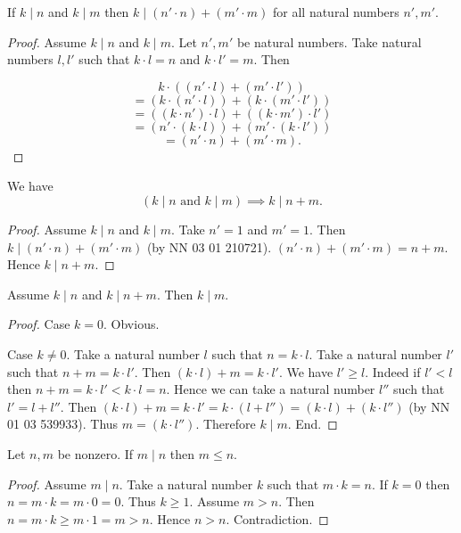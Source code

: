 \documentclass[../../natural-numbers.ftl.tex]{subfiles}
\begin{document}
\begin{forthel}
    \begin{proposition}[NN 03 01 210721]
      If $k \mid n$ and $k \mid m$ then $k \mid (n' \cdot n) + (m' \cdot m)$ for all natural numbers $n',m'$.
    \end{proposition}
    \begin{proof}
      Assume $k \mid n$ and $k \mid m$.
      Let $n',m'$ be natural numbers.
      Take natural numbers $l,l'$ such that $k \cdot l = n$ and $k \cdot l' = m$.
      Then

      \[   k \cdot ((n' \cdot l) + (m' \cdot l')) \]
      \[ = (k \cdot (n' \cdot l)) + (k \cdot (m' \cdot l')) \]
      \[ = ((k \cdot n') \cdot l) + ((k \cdot m') \cdot l') \]
      \[ = (n' \cdot (k \cdot l)) + (m' \cdot (k \cdot l')) \]
      \[ = (n' \cdot n) + (m' \cdot m). \]
    \end{proof}

    \begin{corollary}
      We have \[ (\text{$k \mid n$ and $k \mid m$}) \implies k \mid n + m. \]
    \end{corollary}
    \begin{proof}
      Assume $k \mid n$ and $k \mid m$.
      Take $n' = 1$ and $m' = 1$.
      Then $k \mid (n' \cdot n) + (m' \cdot m)$ (by NN 03 01 210721).
      $(n' \cdot n) + (m' \cdot m) = n + m$.
      Hence $k \mid n + m$.
    \end{proof}

    \begin{proposition}[NN 03 01 695362]
      Assume $k \mid n$ and $k \mid n + m$.
      Then $k \mid m$.
    \end{proposition}
    \begin{proof}
      Case $k = 0$. Obvious.

      Case $k \neq 0$.
        Take a natural number $l$ such that $n = k \cdot l$.
        Take a natural number $l'$ such that $n + m = k \cdot l'$.
        Then $(k \cdot l) + m = k \cdot l'$.
        We have $l' \geq l$.
        Indeed if $l' < l$ then $n + m = k \cdot l' < k \cdot l = n$.
        Hence we can take a natural number $l''$ such that $l' = l + l''$.
        Then $(k \cdot l) + m = k \cdot l' = k \cdot (l + l'') = (k \cdot l) + (k \cdot l'')$ (by NN 01 03 539933).
        Thus $m = (k \cdot l'')$.
        Therefore $k \mid m$.
      End.
    \end{proof}

    \begin{proposition}[NN 03 01 376821]
      Let $n,m$ be nonzero.
      If $m \mid n$ then $m \leq n$.
    \end{proposition}
    \begin{proof}
      Assume $m \mid n$.
      Take a natural number $k$ such that $m \cdot k = n$.
      If $k = 0$ then $n = m \cdot k = m \cdot 0 = 0$.
      Thus $k \geq 1$.
      Assume $m > n$.
      Then $n = m \cdot k \geq m \cdot 1 = m > n$.
      Hence $n > n$.
      Contradiction.
    \end{proof}


\end{forthel}
\end{document}
